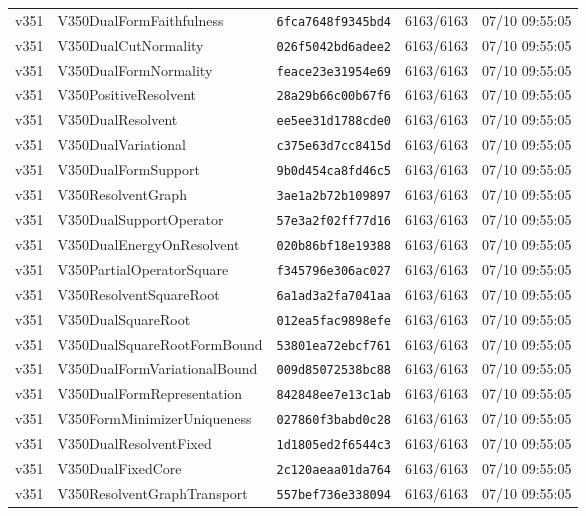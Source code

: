 \documentclass[11pt]{article}
\theoremstyle{definition}\newtheorem{deriv}{Derivação}
\begin{document}
{\begin{longtable}{@{}lllll@{}}
v351 & V350DualFormFaithfulness & \texttt{6fca7648f9345bd4} & 6163/6163 & 07/10 09:55:05 \\
v351 & V350DualCutNormality & \texttt{026f5042bd6adee2} & 6163/6163 & 07/10 09:55:05 \\
v351 & V350DualFormNormality & \texttt{feace23e31954e69} & 6163/6163 & 07/10 09:55:05 \\
v351 & V350PositiveResolvent & \texttt{28a29b66c00b67f6} & 6163/6163 & 07/10 09:55:05 \\
v351 & V350DualResolvent & \texttt{ee5ee31d1788cde0} & 6163/6163 & 07/10 09:55:05 \\
v351 & V350DualVariational & \texttt{c375e63d7cc8415d} & 6163/6163 & 07/10 09:55:05 \\
v351 & V350DualFormSupport & \texttt{9b0d454ca8fd46c5} & 6163/6163 & 07/10 09:55:05 \\
v351 & V350ResolventGraph & \texttt{3ae1a2b72b109897} & 6163/6163 & 07/10 09:55:05 \\
v351 & V350DualSupportOperator & \texttt{57e3a2f02ff77d16} & 6163/6163 & 07/10 09:55:05 \\
v351 & V350DualEnergyOnResolvent & \texttt{020b86bf18e19388} & 6163/6163 & 07/10 09:55:05 \\
v351 & V350PartialOperatorSquare & \texttt{f345796e306ac027} & 6163/6163 & 07/10 09:55:05 \\
v351 & V350ResolventSquareRoot & \texttt{6a1ad3a2fa7041aa} & 6163/6163 & 07/10 09:55:05 \\
v351 & V350DualSquareRoot & \texttt{012ea5fac9898efe} & 6163/6163 & 07/10 09:55:05 \\
v351 & V350DualSquareRootFormBound & \texttt{53801ea72ebcf761} & 6163/6163 & 07/10 09:55:05 \\
v351 & V350DualFormVariationalBound & \texttt{009d85072538bc88} & 6163/6163 & 07/10 09:55:05 \\
v351 & V350DualFormRepresentation & \texttt{842848ee7e13c1ab} & 6163/6163 & 07/10 09:55:05 \\
v351 & V350FormMinimizerUniqueness & \texttt{027860f3babd0c28} & 6163/6163 & 07/10 09:55:05 \\
v351 & V350DualResolventFixed & \texttt{1d1805ed2f6544c3} & 6163/6163 & 07/10 09:55:05 \\
v351 & V350DualFixedCore & \texttt{2c120aeaa01da764} & 6163/6163 & 07/10 09:55:05 \\
v351 & V350ResolventGraphTransport & \texttt{557bef736e338094} & 6163/6163 & 07/10 09:55:05 \\

\end{longtable}}
\end{document}
